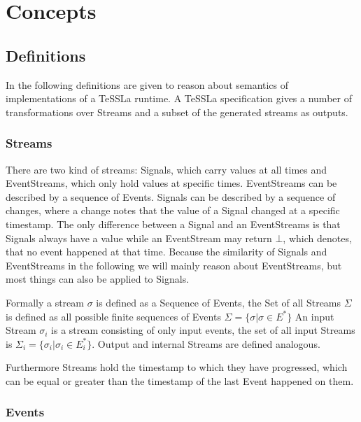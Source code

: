 \chapter{Concepts}
\label{sec:concepts}

\section{Definitions}
\label{sec:concepts:defs}

In the following definitions are given to reason about semantics of implementations of a TeSSLa runtime.
A TeSSLa specification gives a number of transformations over Streams and a subset of the generated streams as outputs.

\subsection{Streams}
\label{sec:concepts:defs:streams}

There are two kind of streams: Signals, which carry values at all times and EventStreams, which only hold values at specific times.
EventStreams can be described by a sequence of Events.
Signals can be described by a sequence of changes, where a change notes that the value of a Signal changed at a specific timestamp.
The only difference between a Signal and an EventStreams is that Signals always have a value while an EventStream may return \(\bot\), which denotes, that no event happened at that time.
Because the similarity of Signals and EventStreams in the following we will mainly reason about EventStreams, but most things can also be applied to Signals.

Formally a stream \(\sigma\) is defined as a Sequence of Events, the Set of all Streams \(\Sigma\) is defined as all possible finite sequences of Events \(\Sigma = \{\sigma | \sigma \in E^* \}\)
An input Stream \(\sigma_i\) is a stream consisting of only input events, the set of all input Streams is \(\Sigma_i = \{\sigma_i | \sigma_i \in E_i^*\}\).
Output and internal Streams are defined analogous.

Furthermore Streams hold the timestamp to which they have progressed, which can be equal or greater than the timestamp of the last Event happened on them.

\subsection{Events}
\label{sec:concepts:defs:events}

